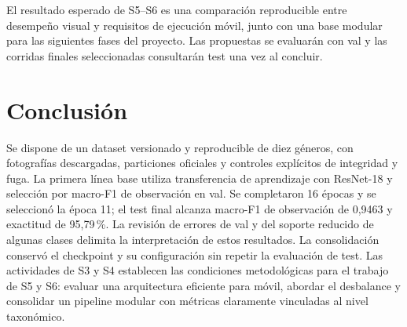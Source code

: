 \documentclass[11pt,a4paper]{article}
\begin{document}
El resultado esperado de S5--S6 es una comparación reproducible entre desempeño
visual y requisitos de ejecución móvil, junto con una base modular para las
siguientes fases del proyecto. Las propuestas se evaluarán con val y las corridas
finales seleccionadas consultarán test una vez al concluir.

\section{Conclusión}

Se dispone de un dataset versionado y reproducible de diez géneros, con fotografías
descargadas, particiones oficiales y controles explícitos de integridad y fuga.
La primera línea base utiliza transferencia de aprendizaje con ResNet-18 y selección
por macro-F1 de observación en val. Se completaron 16 épocas y se seleccionó la
época 11; el test final alcanza macro-F1 de observación de 0,9463 y exactitud de
95,79\,\%. La revisión de errores de val y del soporte reducido de algunas clases
delimita la interpretación de estos resultados. La consolidación conservó el
checkpoint y su configuración sin repetir la evaluación de test. Las actividades de S3 y S4
establecen las condiciones metodológicas para el trabajo de S5 y S6: evaluar
una arquitectura eficiente para móvil, abordar el desbalance y consolidar un
pipeline modular con métricas claramente vinculadas al nivel taxonómico.
\end{document}
